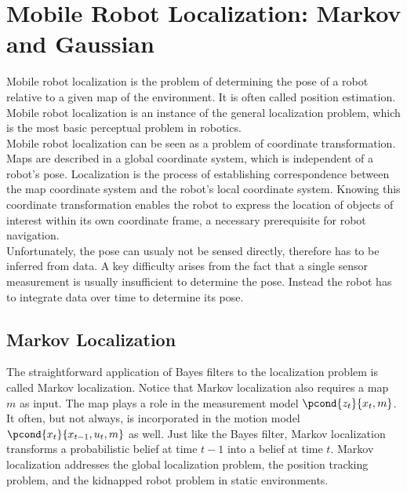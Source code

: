 \section{Mobile Robot Localization: Markov and Gaussian}

Mobile robot localization is the problem of determining the pose of a robot relative to a given map of the environment. It is often called position estimation. Mobile robot localization is an instance of the general localization problem, which is the most basic perceptual problem in robotics. \\

Mobile robot localization can be seen as a problem of coordinate transformation. Maps are described in a global coordinate system, which is independent of a robot’s pose.
Localization is the process of establishing correspondence between the map coordinate system and the robot’s local coordinate system.
Knowing this coordinate transformation enables the robot to express the location of objects of interest within its own coordinate frame, a necessary prerequisite for robot navigation.\\

Unfortunately, the pose can usualy not be sensed directly, therefore has to be inferred from data. A key difficulty arises from the fact that a single sensor measurement is usually insufficient to determine the pose.
Instead the robot has to integrate data over time to determine its pose.

\subsection{Markov Localization}

The straightforward application of Bayes filters to the localization problem is called Markov localization.
Notice that Markov localization also requires a map $m$ as input. The map plays a role in the measurement model $\pcond{z_t}{x_t, m}$.
It often, but not always, is incorporated in the motion model $\pcond{x_t}{x_{t-1}, u_t, m}$ as well.
Just like the Bayes filter, Markov localization transforms a probabilistic belief at time $t - 1$ into a belief at time $t$.
Markov localization addresses the global localization problem, the position tracking problem, and the kidnapped robot problem in static environments.

